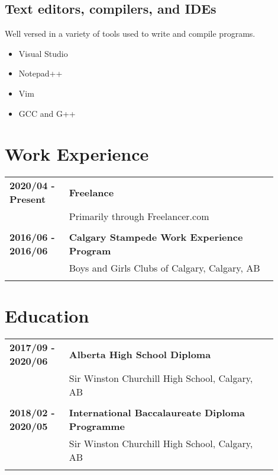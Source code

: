 \documentclass[letterpaper]{article}
\begin{document}
        \subsection*{Text editors, compilers, and IDEs}
        Well versed in a variety of tools used to write and compile programs.

        \begin{itemize}
            \item Visual Studio
            \item Notepad++
            \item Vim
            \item GCC and G++
        \end{itemize}

    \section*{Work Experience}
        \begin{tabular}{p{0.2\linewidth} p{0.7\linewidth}} 
            \textbf{2020/04 - Present} & \large\textbf{Freelance} \\
            & Primarily through Freelancer.com \\
            \\
            \textbf{2016/06 - 2016/06} & \large\textbf{Calgary Stampede Work Experience Program} \\
            & Boys and Girls Clubs of Calgary, Calgary, AB \\
            \\
        \end{tabular}

    \section*{Education}
        \begin{tabular}{p{0.2\linewidth} p{0.7\linewidth}} 
            \textbf{2017/09 - 2020/06} & \large\textbf{Alberta High School Diploma} \\
            & Sir Winston Churchill High School, Calgary, AB \\
            \\
            \textbf{2018/02 - 2020/05} & \large\textbf{International Baccalaureate Diploma Programme} \\
            & Sir Winston Churchill High School, Calgary, AB \\
            \\
        \end{tabular}
\end{document}
